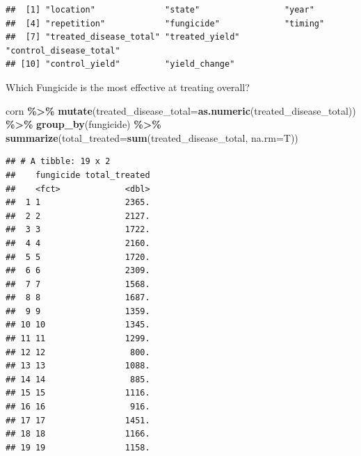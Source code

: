 \documentclass[
]{article}
\newenvironment{Shaded}{\begin{snugshade}}{\end{snugshade}}
\newcommand{\AttributeTok}[1]{\textcolor[rgb]{0.13,0.29,0.53}{#1}}
\newcommand{\FunctionTok}[1]{\textcolor[rgb]{0.13,0.29,0.53}{\textbf{#1}}}
\newcommand{\NormalTok}[1]{#1}
\newcommand{\SpecialCharTok}[1]{\textcolor[rgb]{0.81,0.36,0.00}{\textbf{#1}}}
\begin{document}
\begin{verbatim}
##  [1] "location"              "state"                 "year"                 
##  [4] "repetition"            "fungicide"             "timing"               
##  [7] "treated_disease_total" "treated_yield"         "control_disease_total"
## [10] "control_yield"         "yield_change"
\end{verbatim}

Which Fungicide is the most effective at treating overall?

\begin{Shaded}
\begin{Highlighting}[]
\NormalTok{corn }\SpecialCharTok{\%\textgreater{}\%} 
  \FunctionTok{mutate}\NormalTok{(}\AttributeTok{treated\_disease\_total=}\FunctionTok{as.numeric}\NormalTok{(treated\_disease\_total)) }\SpecialCharTok{\%\textgreater{}\%} 
  \FunctionTok{group\_by}\NormalTok{(fungicide) }\SpecialCharTok{\%\textgreater{}\%} 
  \FunctionTok{summarize}\NormalTok{(}\AttributeTok{total\_treated=}\FunctionTok{sum}\NormalTok{(treated\_disease\_total, }\AttributeTok{na.rm=}\NormalTok{T))}
\end{Highlighting}
\end{Shaded}

\begin{verbatim}
## # A tibble: 19 x 2
##    fungicide total_treated
##    <fct>             <dbl>
##  1 1                 2365.
##  2 2                 2127.
##  3 3                 1722.
##  4 4                 2160.
##  5 5                 1720.
##  6 6                 2309.
##  7 7                 1568.
##  8 8                 1687.
##  9 9                 1359.
## 10 10                1345.
## 11 11                1299.
## 12 12                 800.
## 13 13                1088.
## 14 14                 885.
## 15 15                1116.
## 16 16                 916.
## 17 17                1451.
## 18 18                1166.
## 19 19                1158.
\end{verbatim}
\end{document}
